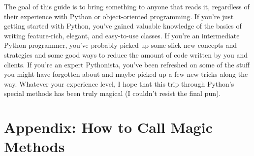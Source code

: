 \documentclass[a4paper,11pt]{article}
\begin{document}
The goal of this guide is to bring something to anyone that reads it, regardless of their experience with Python or object-oriented programming. If you're just getting started with Python, you've gained valuable knowledge of the basics of writing feature-rich, elegant, and easy-to-use classes. If you're an intermediate Python programmer, you've probably picked up some slick new concepts and strategies and some good ways to reduce the amount of code written by you and clients. If you're an expert Pythonista, you've been refreshed on some of the stuff you might have forgotten about and maybe picked up a few new tricks along the way. Whatever your experience level, I hope that this trip through Python's special methods has been truly magical (I couldn't resist the final pun).

\newpage
\section{Appendix: How to Call Magic Methods}
\end{document}
